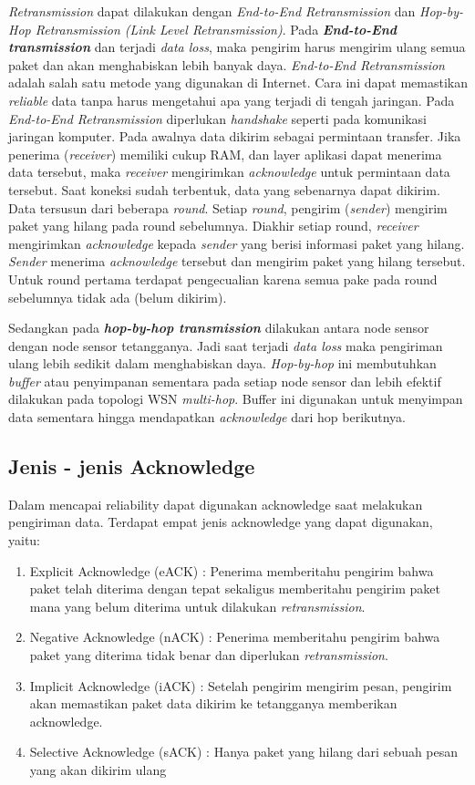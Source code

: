 \textit{Retransmission} dapat dilakukan dengan \textit{End-to-End Retransmission} dan \textit{Hop-by-Hop Retransmission (Link Level Retransmission)}. Pada \textbf{\textit{End-to-End transmission}} dan terjadi \textit{data loss}, maka pengirim harus mengirim ulang semua paket dan akan menghabiskan lebih banyak daya. \textit{End-to-End Retransmission} adalah salah satu metode yang digunakan di Internet. Cara ini dapat memastikan \textit{reliable} data tanpa harus mengetahui apa yang terjadi di tengah jaringan. Pada \textit{End-to-End Retransmission} diperlukan \textit{handshake} seperti pada komunikasi jaringan komputer. Pada awalnya data dikirim sebagai permintaan transfer. Jika penerima (\textit{receiver}) memiliki cukup RAM, dan layer aplikasi dapat menerima data tersebut, maka \textit{receiver} mengirimkan \textit{acknowledge} untuk permintaan data tersebut. Saat koneksi sudah terbentuk, data yang sebenarnya dapat dikirim. Data tersusun dari beberapa \textit{round}. Setiap \textit{round}, pengirim (\textit{sender}) mengirim paket yang hilang pada round sebelumnya. Diakhir setiap  round, \textit{receiver} mengirimkan \textit{acknowledge} kepada \textit{sender} yang berisi informasi paket yang hilang. \textit{Sender} menerima \textit{acknowledge} tersebut dan mengirim paket yang hilang tersebut. Untuk round pertama terdapat pengecualian karena semua pake pada round sebelumnya tidak ada (belum dikirim). 

Sedangkan pada \textbf{\textit{hop-by-hop transmission}} dilakukan antara node sensor dengan node sensor tetangganya. Jadi saat terjadi \textit{data loss} maka pengiriman ulang lebih sedikit dalam menghabiskan daya. \textit{Hop-by-hop} ini membutuhkan \textit{buffer} atau penyimpanan sementara pada setiap node sensor dan lebih efektif dilakukan pada topologi WSN \textit{multi-hop}. Buffer ini digunakan untuk menyimpan data sementara hingga mendapatkan \textit{acknowledge} dari hop berikutnya.

\subsection{Jenis - jenis Acknowledge}
Dalam mencapai reliability dapat digunakan acknowledge saat melakukan pengiriman data. Terdapat empat jenis acknowledge yang dapat digunakan, yaitu:
\begin{enumerate}
	\item Explicit Acknowledge (eACK) : Penerima memberitahu pengirim bahwa paket telah diterima dengan tepat sekaligus memberitahu pengirim paket mana yang belum diterima untuk dilakukan \textit{retransmission}.
	\item Negative Acknowledge (nACK) : Penerima memberitahu pengirim bahwa paket yang diterima tidak benar dan diperlukan \textit{retransmission}.
	\item Implicit Acknowledge (iACK) : Setelah pengirim mengirim pesan, pengirim akan memastikan paket data dikirim ke tetangganya memberikan acknowledge.
	\item Selective Acknowledge (sACK) : Hanya paket yang hilang dari sebuah pesan yang akan dikirim ulang
\end{enumerate}

